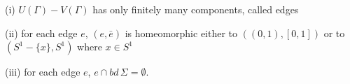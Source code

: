 \hspace*{12pt}(i) $U(\Gamma) - V(\Gamma)$ has only finitely many components, called edges

\hspace*{12pt}(ii) for each edge $e$, $(e, \bar{e})$ is homeomorphic either to $((0, 1), [0, 1])$ or to $(S^1 - \{x\}, S^1)$ where $x \in S^1$

\hspace*{12pt}(iii) for each edge $e$, $e \cap bd \, \Sigma = \emptyset$.
